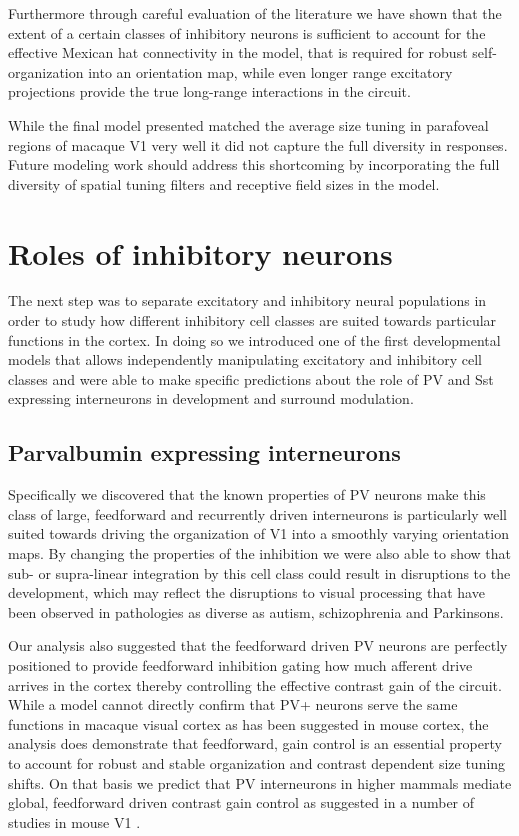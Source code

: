 Furthermore through careful evaluation of the literature we have shown
that the extent of a certain classes of inhibitory neurons is
sufficient to account for the effective Mexican hat connectivity in
the model, that is required for robust self-organization into an
orientation map, while even longer range excitatory projections
provide the true long-range interactions in the circuit.

While the final model presented matched the average size tuning in
parafoveal regions of macaque V1 very well it did not capture the full
diversity in responses. Future modeling work should address this
shortcoming by incorporating the full diversity of spatial tuning
filters and receptive field sizes in the model.

\section{Roles of inhibitory neurons}

The next step was to separate excitatory and inhibitory neural
populations in order to study how different inhibitory cell classes
are suited towards particular functions in the cortex. In doing so we
introduced one of the first developmental models that allows
independently manipulating excitatory and inhibitory cell classes and
were able to make specific predictions about the role of PV and Sst
expressing interneurons in development and surround modulation.

\subsection{Parvalbumin expressing interneurons}

Specifically we discovered that the known properties of PV neurons
make this class of large, feedforward and recurrently driven
interneurons is particularly well suited towards driving the
organization of V1 into a smoothly varying orientation maps. By
changing the properties of the inhibition we were also able to show
that sub- or supra-linear integration by this cell class could result
in disruptions to the development, which may reflect the disruptions
to visual processing that have been observed in pathologies as diverse
as autism, schizophrenia and Parkinsons.

Our analysis also suggested that the feedforward driven PV neurons are
perfectly positioned to provide feedforward inhibition gating how much
afferent drive arrives in the cortex thereby controlling the effective
contrast gain of the circuit. While a model cannot directly confirm
that PV+ neurons serve the same functions in macaque visual cortex as
has been suggested in mouse cortex, the analysis does demonstrate that
feedforward, gain control is an essential property to account for
robust and stable organization and contrast dependent size tuning
shifts. On that basis we predict that PV interneurons in higher
mammals mediate global, feedforward driven contrast gain control as
suggested in a number of studies in mouse V1 \citep{Ma2010,
  Atallah2012, Wilson2012, Nienborg2013}.


